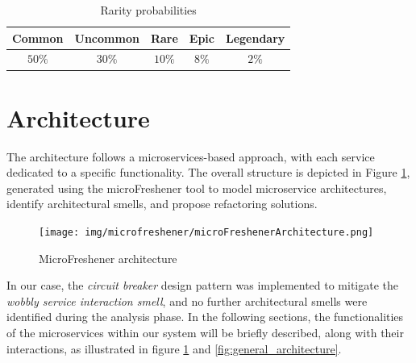 \documentclass{article}
\begin{document}
\begin{table}[ht!] 
    \centering
    \begin{tabular}{|c|c|c|c|c|}
        \hline
        \textbf{Common} & \textbf{Uncommon} & \textbf{Rare} & \textbf{Epic} & \textbf{Legendary} \\
        \hline
        $50\%$          & $30\%$            & $10\%$        & $8\%$         & $2\%$              \\
        \hline
    \end{tabular}
\caption{Rarity probabilities}
\label{tab:rarity}
\end{table}

\newpage
\section{Architecture}
The architecture follows a microservices-based approach, with each service dedicated to a specific functionality. The overall structure is depicted in Figure \ref{fig:microfreshener_architecture}, generated using the microFreshener tool to model microservice architectures, identify architectural smells, and propose refactoring solutions.
\begin{figure}[ht]
    \centering
    \texttt{[image: img/microfreshener/microFreshenerArchitecture.png]}
    \caption{MicroFreshener architecture}
    \label{fig:microfreshener_architecture}
\end{figure}

In our case, the \emph{circuit breaker} design pattern was implemented to mitigate the \emph{wobbly service interaction smell}, and no further architectural smells were identified during the analysis phase.
\newline
In the following sections, the functionalities of the microservices within our system will be briefly described, along with their interactions, as illustrated in figure \ref{fig:microfreshener_architecture} and \ref{fig:general_architecture}.
\end{document}
